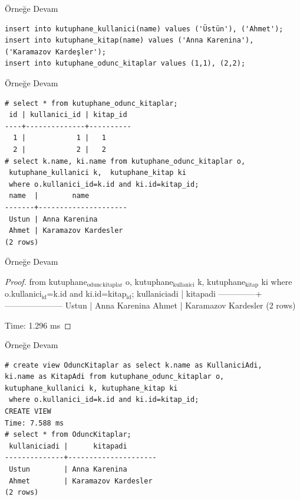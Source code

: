 \documentclass[presentation]{beamer}
\begin{document}
\begin{frame}[fragile,label=sec-32]{Örneğe Devam}
 \begin{verbatim}
insert into kutuphane_kullanici(name) values ('Üstün'), ('Ahmet');
insert into kutuphane_kitap(name) values ('Anna Karenina'), ('Karamazov Kardeşler');
insert into kutuphane_odunc_kitaplar values (1,1), (2,2);
\end{verbatim}
\end{frame}

\begin{frame}[fragile,label=sec-33]{Örneğe Devam}
 \begin{verbatim}
# select * from kutuphane_odunc_kitaplar;
 id | kullanici_id | kitap_id
----+--------------+----------
  1 |            1 |   1
  2 |            2 |   2
# select k.name, ki.name from kutuphane_odunc_kitaplar o,
 kutuphane_kullanici k,  kutuphane_kitap ki
 where o.kullanici_id=k.id and ki.id=kitap_id;
 name  |        name
-------+---------------------
 Ustun | Anna Karenina
 Ahmet | Karamazov Kardesler
(2 rows)
\end{verbatim}
\end{frame}

\begin{frame}[label=sec-34]{Örneğe Devam}
\begin{proof}


from kutuphane$_{\text{odunc}}$$_{\text{kitaplar}}$ o, kutuphane$_{\text{kullanici}}$ k, kutuphane$_{\text{kitap}}$ ki
 where o.kullanici$_{\text{id}}$=k.id and ki.id=kitap$_{\text{id}}$;
 kullaniciadi |      kitapadi
--------------+---------------------
 Ustun        | Anna Karenina
 Ahmet        | Karamazov Kardesler
(2 rows)

Time: 1.296 ms
\end{proof}
\end{frame}

\begin{frame}[fragile,label=sec-35]{Örneğe Devam}
 \begin{verbatim}
# create view OduncKitaplar as select k.name as KullaniciAdi,
ki.name as KitapAdi from kutuphane_odunc_kitaplar o,
kutuphane_kullanici k, kutuphane_kitap ki
 where o.kullanici_id=k.id and ki.id=kitap_id;
CREATE VIEW
Time: 7.588 ms
# select * from OduncKitaplar;
 kullaniciadi |      kitapadi
--------------+---------------------
 Ustun        | Anna Karenina
 Ahmet        | Karamazov Kardesler
(2 rows)
\end{verbatim}
\end{frame}
\end{document}
